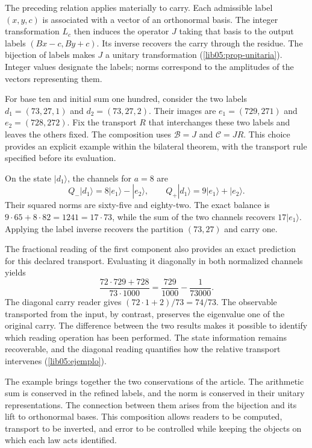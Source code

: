 The preceding relation applies materially to carry. Each
admissible label \((x,y,c)\) is associated with a vector of an
orthonormal basis. The integer transformation \(L_c\) then induces the
operator \(J\) taking that basis to the output labels
\((Bx-c,By+c)\). Its inverse recovers the carry through the
residue. The bijection of labels makes \(J\) a
unitary transformation (\cref{lib05:prop-unitaria}). Integer
values designate the labels; norms correspond to the
amplitudes of the vectors representing them.

For base ten and initial sum one hundred, consider the two labels
\(d_1=(73,27,1)\) and \(d_2=(73,27,2)\). Their images are
\(e_1=(729,271)\) and \(e_2=(728,272)\). Fix the transport
\(R\) that interchanges these two labels and leaves the others fixed.
The composition uses \(\mathcal B=J\) and \(\mathcal C=JR\).
This choice provides an explicit example within the bilateral
theorem, with the transport rule specified before its evaluation.

On the state \(|d_1\rangle\), the channels for \(a=8\)
are
\[
 Q_-|d_1\rangle=8|e_1\rangle-|e_2\rangle,
 \qquad
 Q_+|d_1\rangle=9|e_1\rangle+|e_2\rangle.
\]
Their squared norms are sixty-five and eighty-two. The exact
balance is \(9\cdot65+8\cdot82=1241=17\cdot73\), while
the sum of the two channels recovers \(17|e_1\rangle\).
Applying the label inverse recovers the partition \((73,27)\)
and carry one.

The fractional reading of the first component also provides an
exact prediction for this declared transport. Evaluating it
diagonally in both normalized channels yields
\[
 \frac{72\cdot729+728}{73\cdot1000}
   =\frac{729}{1000}-\frac{1}{73000}.
\]
The diagonal carry reader gives \((72\cdot1+2)/73=74/73\).
The observable transported from the input, by contrast, preserves
the eigenvalue one of the original carry. The difference between the two
results makes it possible to identify which reading operation has
been performed. The state information remains recoverable, and the
diagonal reading quantifies how the relative transport intervenes
(\cref{lib05:ejemplo}).

The example brings together the two conservations of the article. The
arithmetic sum is conserved in the refined labels, and the norm is
conserved in their unitary representations. The connection between them
arises from the bijection and its lift to orthonormal bases.
This composition allows readers to be computed, transport to be inverted,
and error to be controlled while keeping the objects on
which each law acts identified.

